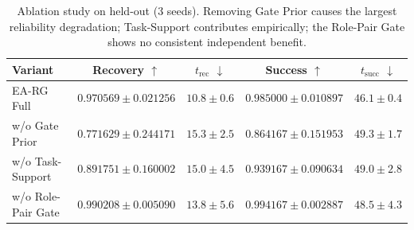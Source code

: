 \begin{table}[t]
\centering
\small
\caption{Ablation study on held-out (3 seeds). Removing Gate Prior causes the largest reliability degradation; Task-Support contributes empirically; the Role-Pair Gate shows no consistent independent benefit.}
\label{tab:ablation}
\begin{tabular}{lcccc}
\toprule
Variant & Recovery $\uparrow$ & $t_{\mathrm{rec}}$ $\downarrow$ & Success $\uparrow$ & $t_{\mathrm{succ}}$ $\downarrow$ \\
\midrule
EA-RG Full & $0.970569 \pm 0.021256$ & $10.8 \pm 0.6$ & $0.985000 \pm 0.010897$ & $46.1 \pm 0.4$ \\
w/o Gate Prior & $0.771629 \pm 0.244171$ & $15.3 \pm 2.5$ & $0.864167 \pm 0.151953$ & $49.3 \pm 1.7$ \\
w/o Task-Support & $0.891751 \pm 0.160002$ & $15.0 \pm 4.5$ & $0.939167 \pm 0.090634$ & $49.0 \pm 2.8$ \\
w/o Role-Pair Gate & $0.990208 \pm 0.005090$ & $13.8 \pm 5.6$ & $0.994167 \pm 0.002887$ & $48.5 \pm 4.3$ \\
\bottomrule
\end{tabular}
\end{table}